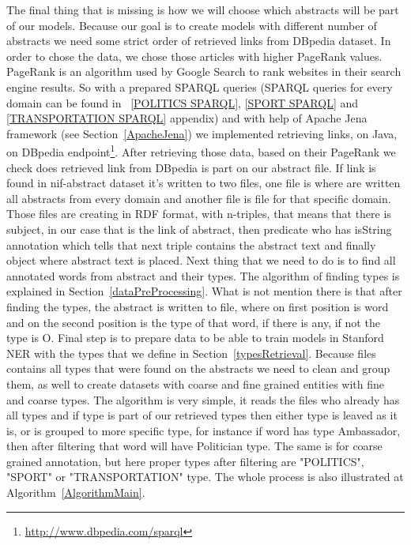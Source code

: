 \documentclass[thesis=M,english]{FITthesis}[2018/05/30]
\begin{document}
	The final thing that is missing is how we will choose which abstracts will be part of our models. Because our goal is to create models with different number of abstracts we need some strict order of retrieved links from DBpedia dataset. In order to chose the data, we chose those articles with higher PageRank values. PageRank \cite{wiki:PR} is an algorithm used by Google Search to rank websites in their search engine results. So with a prepared SPARQL queries (SPARQL queries for every domain can be found in ~\ref{POLITICS SPARQL}, \ref{SPORT SPARQL} and \ref{TRANSPORTATION SPARQL} appendix) and with help of Apache Jena framework (see Section~\ref{ApacheJena}) we implemented retrieving links, on Java, on DBpedia endpoint\footnote{\url{http://www.dbpedia.com/sparql}}. After retrieving those data, based on their PageRank we check does retrieved link from DBpedia is part on our abstract file. If link is found in nif-abstract dataset it's written to two files, one file is where are written all abstracts from every domain and another file is file for that specific domain. Those files are creating in RDF format, with n-triples, that means that there is subject, in our case that is the link of abstract, then predicate who has isString annotation which tells that next triple contains the abstract text and finally object where abstract text is placed. Next thing that we need to do is to find all annotated words from abstract and their types. The algorithm of finding types is explained in Section~\ref{dataPreProcessing}. What is not mention there is that after finding the types, the abstract is written to file, where on first position is word and on the second position is the type of that word, if there is any, if not the type is O. Final step is to prepare data to be able to train models in Stanford NER with the types that we define in Section~\ref{typesRetrieval}. Because files contains all types that were found on the abstracts we need to clean and group them, as well to create datasets with coarse and fine grained entities with fine and coarse types. The algorithm is very simple, it reads the files who already has all types and if type is part of our retrieved types then either type is leaved as it is, or is grouped to more specific type, for instance if word has type Ambassador, then after filtering that word will have Politician type. The same is for coarse grained annotation, but here proper types after filtering are "POLITICS", "SPORT" or "TRANSPORTATION" type. The whole process is also illustrated at Algorithm~\ref{AlgorithmMain}.
	
\end{document}
